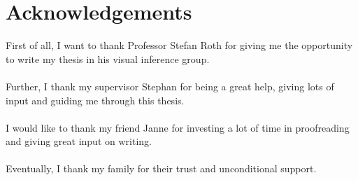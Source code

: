 \documentclass[
type=bsc,			%
accentcolor=\Thesiscolor,	%
colorbacktitle,		%
11pt				%
]{tudthesis}
\author{Daniel José Ceballos Jung}
\begin{document}
	\makethesistitle
	
	
	\section*{Acknowledgements}
	First of all, I want to thank Professor Stefan Roth for giving me the opportunity to write my thesis in his visual inference group.\\ \\
	Further, I thank my supervisor Stephan for being a great help, giving lots of input and guiding me through this thesis. \\ \\
	I would like to thank my friend Janne for investing a lot of time in proofreading and giving great input on writing. \\ \\
	Eventually, I thank my family for their trust and unconditional support.
	\clearpage
	
	\begin{abstract}
		
	\end{abstract}
	
	\tableofcontents
	
	
	
	
	
	
	
	
	
	\clearpage
	\listoffigures
	\listoftables
	
	{}
	
	
\end{document}
